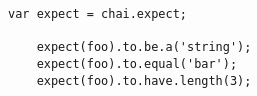 
\begin{lstlisting}[basicstyle=\basicstyle]
	var expect = chai.expect;
		
	expect(foo).to.be.a('string');
	expect(foo).to.equal('bar');
	expect(foo).to.have.length(3);
\end{lstlisting}
